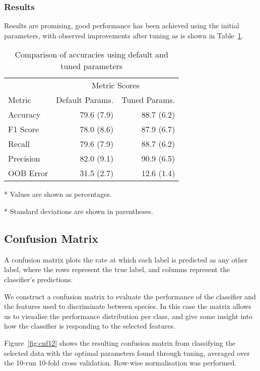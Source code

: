 \subsubsection{Results}
Results are promising, good performance has been achieved using the initial
parameters, with observed improvements after tuning as is shown in
Table~\ref{tbl:acc_before_after}.

\begin{table}[!htb]
  \centering
  \caption{Comparison of accuracies using default and tuned parameters}
  \label{tbl:acc_before_after}
  \begin{threeparttable}
    \begin{tabular}{l r r}
      & \multicolumn{2}{c}{Metric Scores} \\
      Metric    & Default Params. & Tuned Params. \\ \hline
      Accuracy  & 79.6 (7.9) & 88.7 (6.2) \\
      F1 Score  & 78.0 (8.6) & 87.9 (6.7) \\
      Recall    & 79.6 (7.9) & 88.7 (6.2) \\
      Precision & 82.0 (9.1) & 90.9 (6.5) \\
      OOB Error & 31.5 (2.7) & 12.6 (1.4)
    \end{tabular}
    \begin{tablenotes}
      \footnotesize
      \item[*] Values are shown as percentages.
      \item[*] Standard deviations are shown in parentheses.
    \end{tablenotes}
  \end{threeparttable}
\end{table}

\subsection{Confusion Matrix}
A confusion matrix plots the rate at which each label is predicted as any other
label, where the rows represent the true label, and columns represent the
classifier's predictions.

We construct a confusion matrix to evaluate the performance of the classifier
and the features used to discriminate between species.
In this case the matrix allows us to visualise the performance distribution per
class, and give
some insight into how the classifier is responding to the selected features.

Figure~\ref{fig:cnf12} shows the resulting confusion matrix from classifying the
selected data with the optimal parameters found through tuning,
averaged over the 10-run 10-fold cross validation.
Row-wise normalisation was performed.

